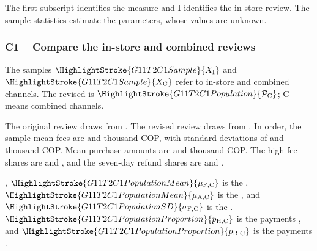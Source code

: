 	The first subscript identifies the measure and $\mathrm{I}$ identifies the in-store review. The sample statistics estimate the parameters, whose values are unknown.


	
	\subsubsection*{C1 -- Compare the in-store and combined reviews}
	\label{sol:c1-merchant-fees-b}

    The samples $\HighlightStroke{G11T2C1Sample}{X_{\mathrm{I}}}$ and $\HighlightStroke{G11T2C1Sample}{X_{\mathrm{C}}}$ refer to in-store and combined channels. The revised  is $\HighlightStroke{G11T2C1Population}{\mathcal{P}_{\mathrm{C}}}$; C means combined channels.

	The original review draws  from  . The revised review draws  from  . In order, the sample mean fees are  and  thousand COP, with standard deviations of  and  thousand COP. Mean purchase amounts are  and  thousand COP. The high-fee shares are  and , and the seven-day refund shares are  and .

	{\raggedright {}, $\HighlightStroke{G11T2C1PopulationMean}{\mu_{\mathrm{F,C}}}$ is the , $\HighlightStroke{G11T2C1PopulationMean}{\mu_{\mathrm{A,C}}}$ is the , and $\HighlightStroke{G11T2C1PopulationSD}{\sigma_{\mathrm{F,C}}}$ is the . $\HighlightStroke{G11T2C1PopulationProportion}{p_{\mathrm{H,C}}}$ is the  payments , and $\HighlightStroke{G11T2C1PopulationProportion}{p_{\mathrm{R,C}}}$ is the  payments .\par}

